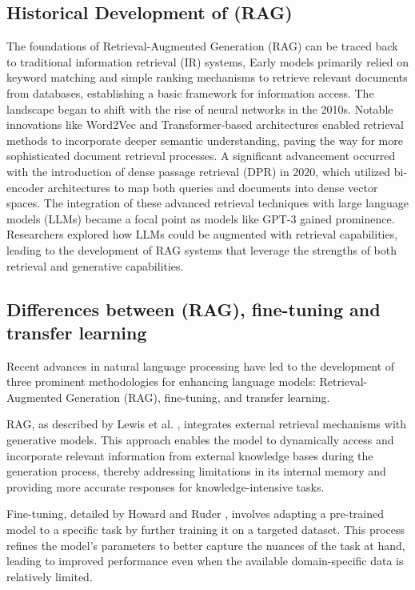 \subsection{Historical Development of (RAG)}
The foundations of Retrieval-Augmented Generation (RAG) can be traced back to traditional information retrieval (IR) systems,  Early models primarily relied on keyword matching and simple ranking mechanisms to retrieve relevant documents from databases, establishing a basic framework for information access. The landscape began to shift with the rise of neural networks in the 2010s. Notable innovations like Word2Vec and Transformer-based architectures enabled retrieval methods to incorporate deeper semantic understanding, paving the way for more sophisticated document retrieval processes.
A significant advancement occurred with the introduction of dense passage retrieval (DPR) in 2020, which utilized bi-encoder architectures to map both queries and documents into dense vector spaces. 
The integration of these advanced retrieval techniques with large language models (LLMs) became a focal point as models like GPT-3 gained prominence. Researchers explored how LLMs could be augmented with retrieval capabilities, leading to the development of RAG systems that leverage the strengths of both retrieval and generative capabilities\cite{gao2024retrieval}.
\subsection{Differences between (RAG), fine-tuning and transfer learning}
Recent advances in natural language processing have led to the development of three prominent methodologies for enhancing language models: Retrieval-Augmented Generation (RAG), fine-tuning, and transfer learning.

RAG, as described by Lewis et al. \cite{lewis2020retrieval}, integrates external retrieval mechanisms with generative models. This approach enables the model to dynamically access and incorporate relevant information from external knowledge bases during the generation process, thereby addressing limitations in its internal memory and providing more accurate responses for knowledge-intensive tasks.

Fine-tuning, detailed by Howard and Ruder \cite{howard2018universal}, involves adapting a pre-trained model to a specific task by further training it on a targeted dataset. This process refines the model’s parameters to better capture the nuances of the task at hand, leading to improved performance even when the available domain-specific data is relatively limited.

